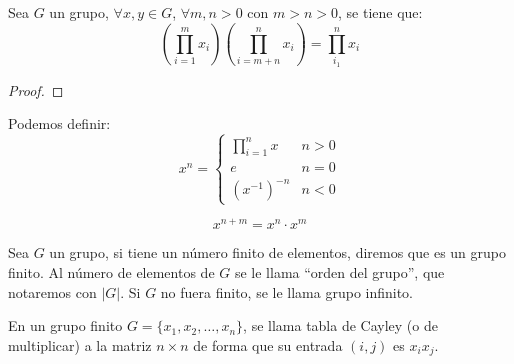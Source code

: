 \begin{prop}
    Sea $G$ un grupo, $\forall x,y\in G$, $\forall m,n > 0$ con $m>n>0$, se tiene que:
    \begin{equation*}
        \left(\prod_{i=1}^m x_i\right) \left(\prod_{i=m+n}^nx_i\right) = \prod_{i_1}^n x_i
    \end{equation*}
    \begin{proof} %
    \end{proof}
\end{prop}

\begin{definicion}[Potencia]
    Podemos definir:
    \begin{equation*}
        x^n = \left\{\begin{array}{cr}
                \prod_{i=1}^n x & n > 0 \\
                e & n = 0 \\
                {(x^{-1})}^{-n} & n < 0
        \end{array}\right.
    \end{equation*}
\end{definicion}

\begin{prop}
    \begin{equation*}
        x^{n+m} = x^n \cdot x^m
    \end{equation*}
\end{prop}

\begin{definicion}
    Sea $G$ un grupo, si tiene un número finito de elementos, diremos que es un grupo finito. Al número de elementos de $G$ se le llama ``orden del grupo'', que notaremos con $|G|$. Si $G$ no fuera finito, se le llama grupo infinito.
\end{definicion}

\begin{definicion}
    En un grupo finito $G=\{x_1,x_2,\ldots,x_n\}$, se llama tabla de Cayley (o de multiplicar) a la matriz $n\times n$ de forma que su entrada $(i,j)$ es $x_ix_j$.
\end{definicion}

